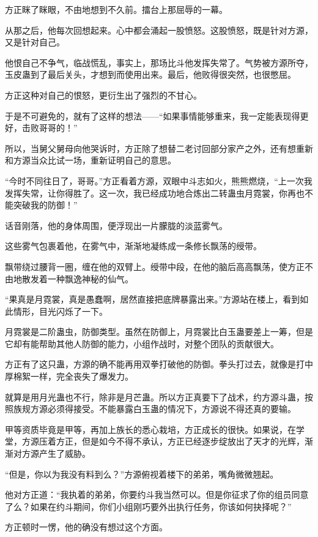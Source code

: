 \begin{this_body}
方正眯了眯眼，不由地想到不久前。擂台上那屈辱的一幕。

从那之后，他每次回想起来。心中都会涌起一股愤怒。这股愤怒，既是针对方源，又是针对自己。

他恨自己不争气，临战慌乱，事实上，那场比斗他发挥失常了。气势被方源所夺，玉皮蛊到了最后关头，才想到而使用出来。最后，他败得很突然，也很憋屈。

方正这种对自己的恨怒，更衍生出了强烈的不甘心。

于是不可避免的，就有了这样的想法——“如果事情能够重来，我一定能表现得更好，击败哥哥的！”

所以，当舅父舅母向他哭诉时，方正除了想替二老讨回部分家产之外，还有想重新和方源当众比试一场，重新证明自己的意思。

“今时不同往日了，哥哥。”方正看着方源，双眼中斗志如火，熊熊燃烧，“上一次我发挥失常，让你得胜了。这一次，我已经成功地合炼出二转蛊虫月霓裳，你再也不能突破我的防御！”

话音刚落，他的身体周围，便浮现出一片朦胧的淡蓝雾气。

这些雾气包裹着他，在雾气中，渐渐地凝练成一条修长飘荡的绶带。

飘带绕过腰背一圈，缠在他的双臂上。绶带中段，在他的脑后高高飘荡，使方正不由地散发着一种飘逸神秘的仙气。

“果真是月霓裳，真是愚蠢啊，居然直接把底牌暴露出来。”方源站在楼上，看到如此情形，目光闪烁了一下。

月霓裳是二阶蛊虫，防御类型。虽然在防御上，月霓裳比白玉蛊要差上一筹，但是它却有能帮助其他人防御的能力，小组作战时，对整个团队的贡献很大。

方正有了这只蛊，方源的确不能再用双拳打破他的防御。拳头打过去，就像是打中厚棉絮一样，完全丧失了爆发力。

就算是用月光蛊也不行，除非是月芒蛊。所以方正真要下了战术，约方源斗蛊，按照族规方源必须得接受。不能暴露白玉蛊的情况下，方源说不得还真的要输。

甲等资质毕竟是甲等，再加上族长的悉心栽培，方正成长的很快。如果说，在学堂，方源压着方正，但是如今不得不承认，方正已经逐步绽放出了天才的光辉，渐渐对方源产生了威胁。

“但是，你以为我没有料到么？”方源俯视着楼下的弟弟，嘴角微微翘起。

他对方正道：“我执着的弟弟，你要约斗我当然可以。但是你征求了你的组员同意了么？如果在约斗期间，你们小组刚巧要外出执行任务，你该如何抉择呢？”

方正顿时一愣，他的确没有想过这个方面。


\end{this_body}
